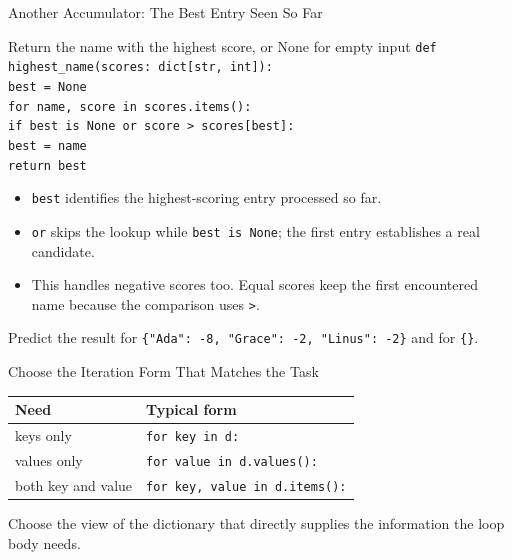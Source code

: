 \documentclass[aspectratio=169,10pt]{beamer}
\begin{document}
\begin{frame}{Another Accumulator: The Best Entry Seen So Far}
  \small
  \begin{block}{Return the name with the highest score, or None for empty input}
    \texttt{def highest\_name(scores: dict[str, int]):}\\
    \hspace{0.20in}\texttt{best = None}\\
    \hspace{0.20in}\texttt{for name, score in scores.items():}\\
    \hspace{0.40in}\texttt{if best is None or score > scores[best]:}\\
    \hspace{0.60in}\texttt{best = name}\\
    \hspace{0.20in}\texttt{return best}
  \end{block}
  \begin{itemize}
    \item \texttt{best} identifies the highest-scoring entry processed so far.
    \item \texttt{or} skips the lookup while \texttt{best is None}; the first entry establishes a real candidate.
    \item This handles negative scores too. Equal scores keep the first encountered name because the comparison uses \texttt{>}.
  \end{itemize}
  \begin{activity}
    Predict the result for \texttt{\{"Ada": -8, "Grace": -2, "Linus": -2\}} and for \texttt{\{\}}.
  \end{activity}
\end{frame}

\begin{frame}{Choose the Iteration Form That Matches the Task}
  \begin{center}
    \renewcommand{\arraystretch}{1.30}
    \begin{tabular}{l|l}
      \textbf{Need} & \textbf{Typical form} \\\hline
      keys only & \texttt{for key in d:} \\
      values only & \texttt{for value in d.values():} \\
      both key and value & \texttt{for key, value in d.items():}
    \end{tabular}
  \end{center}

  \begin{keyidea}
    Choose the view of the dictionary that directly supplies the information the loop body needs.
  \end{keyidea}
\end{frame}
\end{document}
